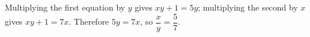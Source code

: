 Multiplying the first equation by $ y $ gives $ xy+1=5y $; multiplying the second by $ x $ gives $ xy+1=7x $. Therefore $ 5y=7x $, so $\boxed{\dfrac{x}{y}=\dfrac{5}{7}}$.
